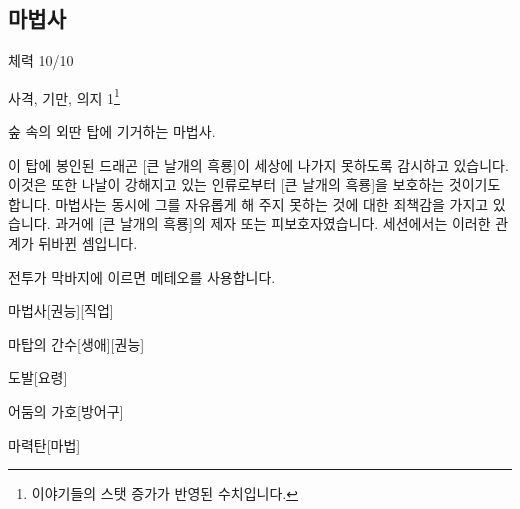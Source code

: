 \documentclass{report}
\begin{document}
	\subsection*{마법사}
		체력 10/10
		
		사격, 기만, 의지 1\footnote{이야기들의 스탯 증가가 반영된 수치입니다.}
		
		숲 속의 외딴 탑에 기거하는 마법사.

		이 탑에 봉인된 드래곤 [큰 날개의 흑룡]이 세상에 나가지 못하도록 감시하고 있습니다. 이것은 또한 나날이 강해지고 있는 인류로부터 [큰 날개의 흑룡]을 보호하는 것이기도 합니다. 마법사는 동시에 그를 자유롭게 해 주지 못하는 것에 대한 죄책감을 가지고 있습니다. 과거에 [큰 날개의 흑룡]의 제자 또는 피보호자였습니다. 세션에서는 이러한 관계가 뒤바뀐 셈입니다.
		
		전투가 막바지에 이르면 메테오를 사용합니다.
	
		\begin{spoiler}{마법사}{[권능][직업]}
			
			
		\end{spoiler}
		
		\begin{spoiler}{마탑의 간수}{[생애][권능]}
			
		\end{spoiler}
		
		\begin{spoiler}{도발}{[요령]}
		\end{spoiler}
		
		\begin{spoiler}{어둠의 가호}{[방어구]}
			
			
		\end{spoiler}
		
		\begin{spoiler}{마력탄}{[마법]}
		\end{spoiler}
		
\end{document}
